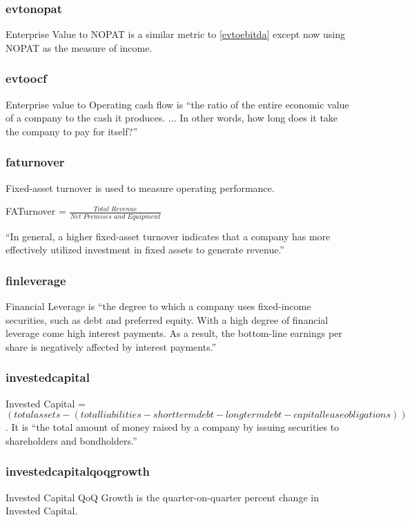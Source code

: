 \subsubsection*{evtonopat}
Enterprise Value to NOPAT is a similar metric to \ref{evtoebitda} except now using NOPAT as the measure of income.

\subsubsection*{evtoocf}
Enterprise value to Operating cash flow is ``the ratio of the entire economic value of a company to the cash it produces. ... In other words, how long does it take the company to pay for itself?''\cite{intrinioDataTags}

\subsubsection*{faturnover}
Fixed-asset turnover is used to measure operating performance. \newline

FATurnover = $\frac{Total \,\, Revenue}{Net \,\, Premises \,\, and \,\, Equipment}$ \newline

``In general, a higher fixed-asset turnover indicates that a company has more effectively utilized investment in fixed assets to generate revenue.''\cite{intrinioDataTags}

\subsubsection*{finleverage}
Financial Leverage is ``the degree to which a company uses fixed-income securities, such as debt and preferred equity. With a high degree of financial leverage come high interest payments. As a result, the bottom-line earnings per share is negatively affected by interest payments.''\cite{intrinioDataTags}

\subsubsection*{investedcapital}
Invested Capital = $(totalassets - (totalliabilities - shorttermdebt - longtermdebt - capitalleaseobligations))$. It is ``the total amount of money raised by a company by issuing securities to shareholders and bondholders.''\cite{intrinioDataTags}

\subsubsection*{investedcapitalqoqgrowth}
Invested Capital QoQ Growth is the quarter-on-quarter percent change in Invested Capital.

